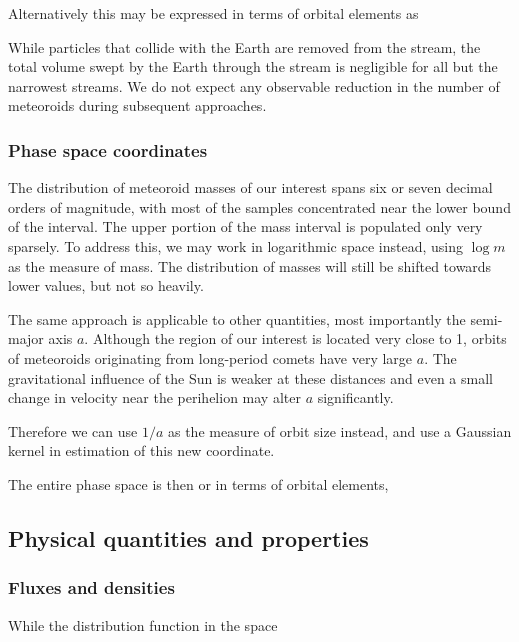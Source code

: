         Alternatively this may be expressed in terms of orbital elements as

        While particles that collide with the Earth are removed from the stream,
        the total volume swept by the Earth through the stream is negligible for all but the narrowest streams.
        We do not expect any observable reduction in the number of meteoroids during subsequent approaches.

        \subsubsection{Phase space coordinates} \label{modc}
            The distribution of meteoroid masses of our interest spans six or seven decimal orders of magnitude,
            with most of the samples concentrated near the lower bound of the interval.
            The upper portion of the mass interval is populated only very sparsely.
            To address this, we may work in logarithmic space instead, using $\log m$ as the measure of mass.
            The distribution of masses will still be shifted towards lower values, but not so heavily.

            The same approach is applicable to other quantities, most importantly the semi-major axis $a$.
            Although the region of our interest is located very close to \SI{1}{\au},
            orbits of meteoroids originating from long-period comets have very large $a$.
            The gravitational influence of the Sun is weaker at these distances and
            even a small change in velocity near the perihelion may alter $a$ significantly.

            Therefore we can use $1/a$ as the measure of orbit size instead,
            and use a Gaussian kernel in estimation of this new coordinate.

            The entire phase space is then
            or in terms of orbital elements,

    \subsection{Physical quantities and properties} \label{mp}
        \subsubsection{Fluxes and densities} \label{msmf}
            While the distribution function in the space

